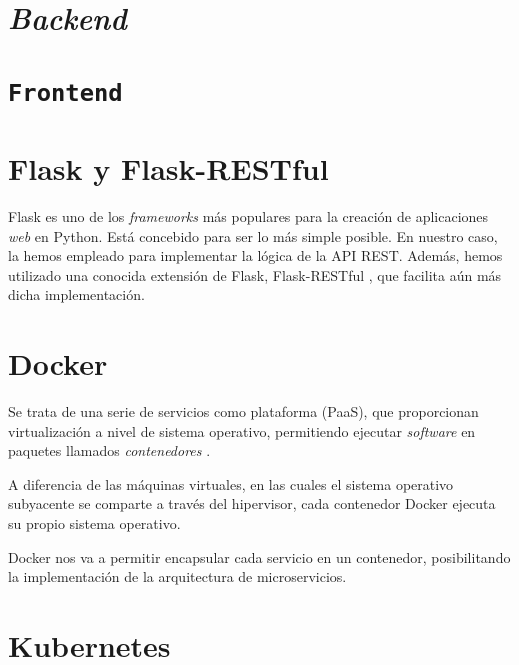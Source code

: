 \section{\emph{Backend}} \label{sec:backend}
\section{\texttt{Frontend}} \label{sec:frontend}

\section{Flask y Flask-RESTful}

Flask es uno de los \emph{frameworks} más populares para la creación de aplicaciones \emph{web} en Python\cite{flask}. Está concebido para ser lo más simple posible. En nuestro caso, la hemos empleado para implementar la lógica de la API REST. Además, hemos utilizado una conocida extensión de Flask, Flask-RESTful \cite{flaskRestful}, que facilita aún más dicha implementación.


\section{Docker}

Se trata de una serie de servicios como plataforma (PaaS), que proporcionan virtualización a nivel de sistema operativo, permitiendo ejecutar \emph{software} en paquetes llamados \emph{contenedores} \cite{docker}.

A diferencia de las máquinas virtuales, en las cuales el sistema operativo subyacente se comparte a través del hipervisor, cada contenedor Docker ejecuta su propio sistema operativo.

Docker nos va a permitir encapsular cada servicio en un contenedor, posibilitando la implementación de la arquitectura de microservicios.



\section{Kubernetes}


